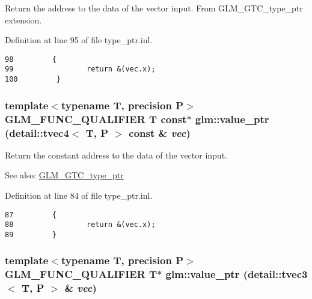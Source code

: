 Return the address to the data of the vector input. From GLM\_\-GTC\_\-type\_\-ptr extension. 

Definition at line 95 of file type\_\-ptr.inl.

\begin{Code}\begin{verbatim}98         {
99                 return &(vec.x);
100         }
\end{verbatim}
\end{Code}


\hypertarget{group__gtc__type__ptr_gc66d56efb1b37e96a17d235374f53a03}{
\subsubsection[value\_\-ptr]{\setlength{\rightskip}{0pt plus 5cm}template$<$typename T, precision P$>$ GLM\_\-FUNC\_\-QUALIFIER T const$\ast$ glm::value\_\-ptr (detail::tvec4$<$ T, P $>$ const \& {\em vec})}}
\label{group__gtc__type__ptr_gc66d56efb1b37e96a17d235374f53a03}


Return the constant address to the data of the vector input. \begin{Desc}
\item[See also:]\hyperlink{group__gtc__type__ptr}{GLM\_\-GTC\_\-type\_\-ptr} \end{Desc}


Definition at line 84 of file type\_\-ptr.inl.

\begin{Code}\begin{verbatim}87         {
88                 return &(vec.x);
89         }
\end{verbatim}
\end{Code}


\hypertarget{group__gtc__type__ptr_ga3e39c9c4cf1c1f573037fb2d6e6a1f9}{
\subsubsection[value\_\-ptr]{\setlength{\rightskip}{0pt plus 5cm}template$<$typename T, precision P$>$ GLM\_\-FUNC\_\-QUALIFIER T$\ast$ glm::value\_\-ptr (detail::tvec3$<$ T, P $>$ \& {\em vec})}}
\label{group__gtc__type__ptr_ga3e39c9c4cf1c1f573037fb2d6e6a1f9}



